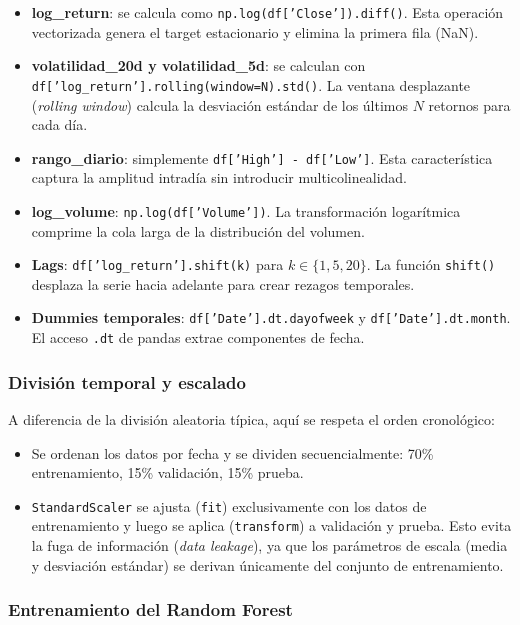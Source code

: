\documentclass[12pt,a4paper]{article}
\begin{document}
\begin{itemize}
    \item \textbf{log\_return}: se calcula como \texttt{np.log(df['Close']).diff()}. Esta operación vectorizada genera el target estacionario y elimina la primera fila (NaN).
    \item \textbf{volatilidad\_20d y volatilidad\_5d}: se calculan con \texttt{df['log\_return'].rolling(window=N).std()}. La ventana desplazante (\textit{rolling window}) calcula la desviación estándar de los últimos $N$ retornos para cada día.
    \item \textbf{rango\_diario}: simplemente \texttt{df['High'] - df['Low']}. Esta característica captura la amplitud intradía sin introducir multicolinealidad.
    \item \textbf{log\_volume}: \texttt{np.log(df['Volume'])}. La transformación logarítmica comprime la cola larga de la distribución del volumen.
    \item \textbf{Lags}: \texttt{df['log\_return'].shift(k)} para $k \in \{1, 5, 20\}$. La función \texttt{shift()} desplaza la serie hacia adelante para crear rezagos temporales.
    \item \textbf{Dummies temporales}: \texttt{df['Date'].dt.dayofweek} y \texttt{df['Date'].dt.month}. El acceso \texttt{.dt} de pandas extrae componentes de fecha.
\end{itemize}

\subsubsection{División temporal y escalado}

A diferencia de la división aleatoria típica, aquí se respeta el orden cronológico:

\begin{itemize}
    \item Se ordenan los datos por fecha y se dividen secuencialmente: 70\% entrenamiento, 15\% validación, 15\% prueba.
    \item \texttt{StandardScaler} se ajusta (\texttt{fit}) exclusivamente con los datos de entrenamiento y luego se aplica (\texttt{transform}) a validación y prueba. Esto evita la fuga de información (\textit{data leakage}), ya que los parámetros de escala (media y desviación estándar) se derivan únicamente del conjunto de entrenamiento.
\end{itemize}

\subsubsection{Entrenamiento del Random Forest}
\end{document}
